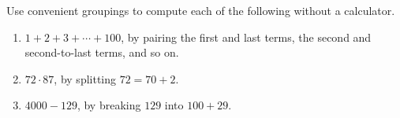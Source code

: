 Use convenient groupings to compute each of the following without a calculator.
\begin{enumerate}
\item[(a)] $1+2+3+\cdots+100$, by pairing the first and last terms, the second and second-to-last terms, and so on.
\item[(b)] $72\cdot87$, by splitting $72=70+2$.
\item[(c)] $4000-129$, by breaking $129$ into $100+29$.
\end{enumerate}
